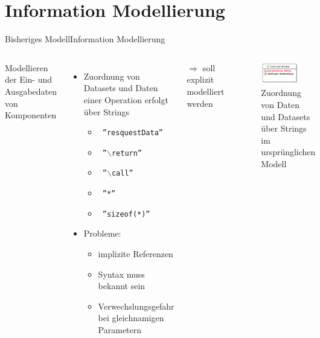\documentclass{sdqbeamer}
\begin{document}
\section{Information Modellierung}
\begin{frame}{Bisheriges Modell}{Information Modellierung}
		\begin{columns}
		Modellieren der Ein- und Ausgabedaten von Komponenten
		\begin{itemize}
			\item Zuordnung von Datasets und Daten einer Operation erfolgt über Strings
			\begin{itemize}
				\item \texttt{  ''resquestData''}
				\item \texttt{  ''$\backslash$return''}
				\item \texttt{  ''$\backslash$call''}
				\item \texttt{  ''*''}
				\item \texttt{  ''sizeof(*)''}
			\end{itemize}
			\item Probleme:
			\begin{itemize}
				\item implizite Referenzen
				\item Syntax muss bekannt sein
				\item Verwechslungsgefahr bei gleichnamigen Parametern
			\end{itemize}
		\end{itemize}
		$\Rightarrow$ soll explizit modelliert werden
		\begin{center}
			\begin{figure}
				\includegraphics[width=0.7\textwidth]{images/ParameterAndDataPair.pdf}
				\caption{Zuordnung von Daten und Datasets über Strings im ursprünglichen Modell}
			\end{figure}
		\end{center}
		\vspace{0.02\textheight}
		
	\end{columns}	
\end{frame}
\end{document}
